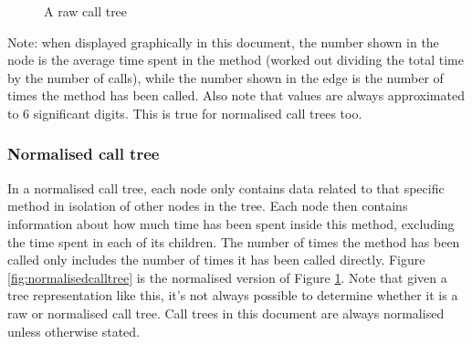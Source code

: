 \begin{figure}
  \caption{A raw call tree}
  \label{fig:rawcalltree}
\end{figure}

\noindent Note: when displayed graphically in this document, the number shown in the node is the average time spent in the method (worked out dividing the total time by the number of calls), while the number shown in the edge is the number of times the method has been called. Also note that values are always approximated to 6 significant digits. This is true for normalised call trees too.


\subsubsection{Normalised call tree}
In a normalised call tree, each node only contains data related to that specific method in isolation of other nodes in the tree. Each node then contains information about how much time has been spent inside this method, excluding the time spent in each of its children. The number of times the method has been called only includes the number of times it has been called directly. Figure \ref{fig:normalisedcalltree} is the normalised version of Figure \ref{fig:rawcalltree}. Note that given a tree representation like this, it's not always possible to determine whether it is a raw or normalised call tree. Call trees in this document are always normalised unless otherwise stated.

